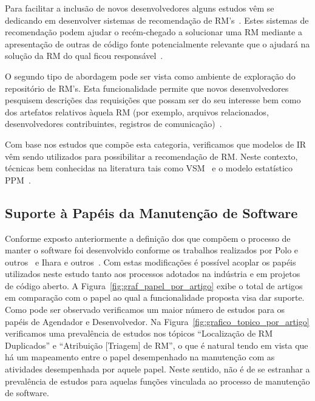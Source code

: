 Para facilitar a inclusão de novos desenvolvedores alguns estudos vêm se
dedicando em desenvolver sistemas de recomendação de
RM's~\cite{malheiros2012source, Wang2011bug}. Estes sistemas de recomendação
podem ajudar o recém-chegado a solucionar uma RM mediante a apresentação de
outras de código fonte potencialmente relevante que o ajudará na solução da RM
do qual ficou responsável~\cite{malheiros2012source}.

O segundo tipo de abordagem pode ser vista como ambiente de exploração do
repositório de RM's.  Esta funcionalidade permite que novos desenvolvedores
pesquisem descrições das requisições que possam ser do seu interesse bem como
dos artefatos relativos àquela RM (por exemplo, arquivos relacionados,
desenvolvedores contribuintes, registros de comunicação)~\cite{Wang2011bug}.

Com base nos estudos que compõe esta categoria, verificamos que modelos de IR
vêm sendo utilizados para possibilitar a recomendação de RM\@. Neste contexto,
técnicas bem conhecidas na literatura tais como VSM~\cite{Wang2011bug} e o
modelo estatístico PPM~\cite{malheiros2012source}.

\subsection{Suporte à Papéis da Manutenção de Software}
\label{sub:extensões_com_suporte_a_papeis}

Conforme exposto anteriormente a definição dos que compõem o processo de manter
o software foi desenvolvido conforme os trabalhos realizados por Polo e
outros~\cite{Polo1999} e Ihara e outros~\cite{Ihara:2009:AMI:1595808.1595833}\@.
Com estas modificações é possível acoplar os papéis utilizados neste estudo
tanto aos processos adotados na indústria e em projetos de código aberto. A
Figura~\ref{fig:graf_papel_por_artigo} exibe o total de artigos em comparação
com o papel ao qual a funcionalidade proposta visa dar suporte. Como pode ser
observado verificamos um maior número de estudos para os papéis de Agendador e
Desenvolvedor. Na Figura~\ref{fig:grafico_topico_por_artigo} verificamos uma
prevalência de estudos nos tópicos ``Localização de RM Duplicados'' e
``Atribuição [Triagem] de RM'', o que  é natural tendo em vista que há um
mapeamento entre o papel desempenhado na manutenção com as atividades
desempenhada por aquele papel. Neste sentido, não é de se estranhar a
prevalência de estudos para aquelas funções vinculada ao processo de manutenção
de software.

